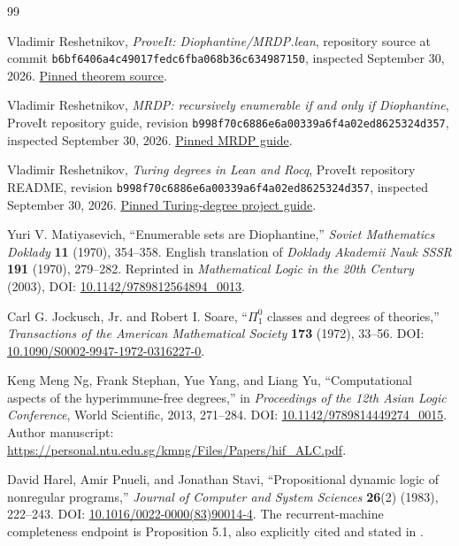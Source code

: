 \documentclass[11pt,letterpaper]{article}
\theoremstyle{definition}
\theoremstyle{remark}
\newcommand{\code}[1]{\texttt{#1}}
\newcommand{\1}{\mathbf 1}
\begin{document}
\begin{thebibliography}{99}
\small\raggedright

Vladimir Reshetnikov, \emph{ProveIt: Diophantine/MRDP.lean},
repository source at commit
\code{b6bf6406a4c49017fedc6fba068b36c634987150}, inspected September 30, 2026.
\href{https://github.com/VladimirReshetnikov/ProveIt/blob/b6bf6406a4c49017fedc6fba068b36c634987150/Computability/HilbertTenthProblem/Lean/Diophantine/MRDP.lean}{Pinned theorem source}.

Vladimir Reshetnikov, \emph{MRDP: recursively enumerable if and only if
Diophantine}, ProveIt repository guide, revision
\code{b998f70c6886e6a00339a6f4a02ed8625324d357}, inspected September 30, 2026.
\href{https://github.com/VladimirReshetnikov/ProveIt/blob/b998f70c6886e6a00339a6f4a02ed8625324d357/Computability/HilbertTenthProblem/Lean/MRDP.md}{Pinned MRDP guide}.

Vladimir Reshetnikov, \emph{Turing degrees in Lean and Rocq},
ProveIt repository README, revision
\code{b998f70c6886e6a00339a6f4a02ed8625324d357}, inspected September 30, 2026.
\href{https://github.com/VladimirReshetnikov/ProveIt/blob/b998f70c6886e6a00339a6f4a02ed8625324d357/Computability/TuringDegrees/README.md}{Pinned Turing-degree project guide}.

Yuri V. Matiyasevich, ``Enumerable sets are Diophantine,''
\emph{Soviet Mathematics Doklady} \textbf{11} (1970), 354--358.
English translation of \emph{Doklady Akademii Nauk SSSR} \textbf{191}
(1970), 279--282. Reprinted in \emph{Mathematical Logic in the 20th Century}
(2003), DOI: \href{https://doi.org/10.1142/9789812564894_0013}{10.1142/9789812564894\_0013}.

Carl G. Jockusch, Jr. and Robert I. Soare,
``$\Pi^0_1$ classes and degrees of theories,''
\emph{Transactions of the American Mathematical Society} \textbf{173}
(1972), 33--56.
DOI: \href{https://doi.org/10.1090/S0002-9947-1972-0316227-0}{10.1090/S0002-9947-1972-0316227-0}.

Keng Meng Ng, Frank Stephan, Yue Yang, and Liang Yu,
``Computational aspects of the hyperimmune-free degrees,''
in \emph{Proceedings of the 12th Asian Logic Conference},
World Scientific, 2013, 271--284.
DOI: \href{https://doi.org/10.1142/9789814449274_0015}{10.1142/9789814449274\_0015}.
Author manuscript: \url{https://personal.ntu.edu.sg/kmng/Files/Papers/hif_ALC.pdf}.

David Harel, Amir Pnueli, and Jonathan Stavi,
``Propositional dynamic logic of nonregular programs,''
\emph{Journal of Computer and System Sciences} \textbf{26}(2)
(1983), 222--243.
DOI: \href{https://doi.org/10.1016/0022-0000(83)90014-4}{10.1016/0022-0000(83)90014-4}.
The recurrent-machine completeness endpoint is Proposition 5.1,
also explicitly cited and stated in \cite{ek2025}.


\end{thebibliography}
\end{document}
